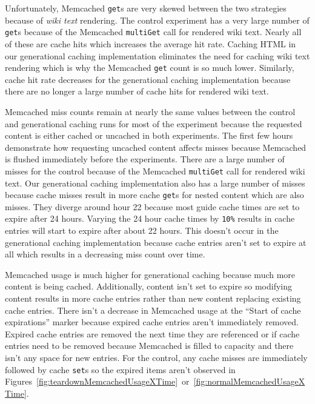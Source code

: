 \documentclass[12pt]{ucthesis}
\begin{document}
Unfortunately, \textsf{Memcached} {\tt get}s are very skewed between the two strategies because of \textit{wiki text} rendering.
The control experiment has a very large number of {\tt get}s because of the \textsf{Memcached} {\tt multiGet} call for rendered wiki text.
Nearly all of these are cache hits which increases the average hit rate.
Caching HTML in our generational caching implementation eliminates the need for caching wiki text rendering which is why the \textsf{Memcached} {\tt get} count is so much lower.
Similarly, cache hit rate decreases for the generational caching implementation because there are no longer a large number of cache hits for rendered wiki text.

\textsf{Memcached} miss counts remain at nearly the same values between the control and generational caching runs for most of the experiment because the requested content is either cached or uncached in both experiments.
The first few hours demonstrate how requesting uncached content affects misses because \textsf{Memcached} is flushed immediately before the experiments.
There are a large number of misses for the control because of the \textsf{Memcached} {\tt multiGet} call for rendered wiki text.
Our generational caching implementation also has a large number of misses because cache misses result in more cache {\tt get}s for nested content which are also misses.
They diverge around hour 22 because most guide cache times are set to expire after 24 hours.
Varying the 24 hour cache times by {\tt 10\%} results in cache entries will start to expire after about 22 hours.
This doesn't occur in the generational caching implementation because cache entries aren't set to expire at all which results in a decreasing miss count over time.

\textsf{Memcached} usage is much higher for generational caching because much more content is being cached.
Additionally, content isn't set to expire so modifying content results in more cache entries rather than new content replacing existing cache entries.
There isn't a decrease in \textsf{Memcached} usage at the ``Start of cache expirations'' marker because expired cache entries aren't immediately removed.
Expired cache entries are removed the next time they are referenced or if cache entries need to be removed because \textsf{Memcached} is filled to capacity and there isn't any space for new entries.
For the control, any cache misses are immediately followed by cache {\tt set}s so the expired items aren't observed in Figures~\ref{fig:teardownMemcachedUsageXTime}~or~\ref{fig:normalMemcachedUsageXTime}.
\end{document}
